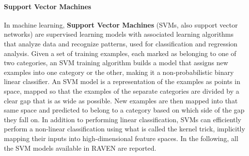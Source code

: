 \paragraph{Support Vector Machines}
\label{SVM}
In machine learning, \textbf{Support Vector Machines} (SVMs, also support vector
networks) are supervised learning models with associated learning algorithms
that analyze data and recognize patterns, used for classification and regression
analysis.
%
Given a set of training examples, each marked as belonging to one of two
categories, an SVM training algorithm builds a model that assigns new examples
into one category or the other, making it a non-probabilistic binary linear
classifier.
%
An SVM model is a representation of the examples as points in space, mapped so
that the examples of the separate categories are divided by a clear gap that is
as wide as possible.
%
New examples are then mapped into that same space and predicted to belong to a
category based on which side of the gap they fall on.
%
In addition to performing linear classification, SVMs can efficiently perform a
non-linear classification using what is called the kernel trick, implicitly
mapping their inputs into high-dimensional feature spaces.
%
In the following, all the SVM models available in RAVEN are reported.

